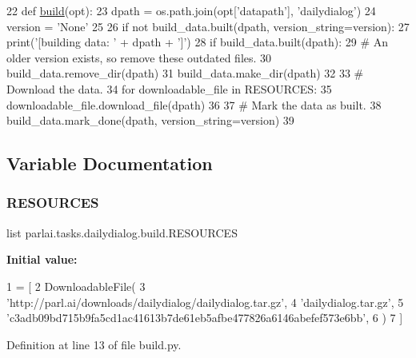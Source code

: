 \begin{DoxyCode}
22 \textcolor{keyword}{def }\hyperlink{namespacedialog__babi__feedback_1_1build_a7a9d289f7493a5ded13c4b7f071b6184}{build}(opt):
23     dpath = os.path.join(opt[\textcolor{stringliteral}{'datapath'}], \textcolor{stringliteral}{'dailydialog'})
24     version = \textcolor{stringliteral}{'None'}
25 
26     \textcolor{keywordflow}{if} \textcolor{keywordflow}{not} build\_data.built(dpath, version\_string=version):
27         print(\textcolor{stringliteral}{'[building data: '} + dpath + \textcolor{stringliteral}{']'})
28         \textcolor{keywordflow}{if} build\_data.built(dpath):
29             \textcolor{comment}{# An older version exists, so remove these outdated files.}
30             build\_data.remove\_dir(dpath)
31         build\_data.make\_dir(dpath)
32 
33         \textcolor{comment}{# Download the data.}
34         \textcolor{keywordflow}{for} downloadable\_file \textcolor{keywordflow}{in} RESOURCES:
35             downloadable\_file.download\_file(dpath)
36 
37         \textcolor{comment}{# Mark the data as built.}
38         build\_data.mark\_done(dpath, version\_string=version)
39 \end{DoxyCode}


\subsection{Variable Documentation}
\mbox{\label{namespaceparlai_1_1tasks_1_1dailydialog_1_1build_ac23bf3be98da838ec5957c457a66c2e6}} 
\subsubsection{\texorpdfstring{R\+E\+S\+O\+U\+R\+C\+ES}{RESOURCES}}
{\footnotesize\ttfamily list parlai.\+tasks.\+dailydialog.\+build.\+R\+E\+S\+O\+U\+R\+C\+ES}

{\bfseries Initial value\+:}
\begin{DoxyCode}
1 =  [
2     DownloadableFile(
3         \textcolor{stringliteral}{'http://parl.ai/downloads/dailydialog/dailydialog.tar.gz'},
4         \textcolor{stringliteral}{'dailydialog.tar.gz'},
5         \textcolor{stringliteral}{'c3adb09bd715b9fa5cd1ac41613b7de61eb5afbe477826a6146abefef573e6bb'},
6     )
7 ]
\end{DoxyCode}


Definition at line 13 of file build.\+py.

